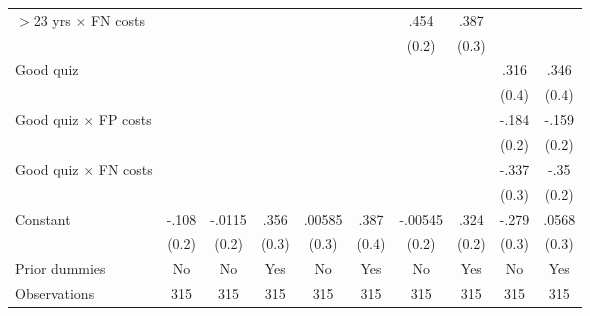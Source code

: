 \begin{table}[htbp]
\begin{tabular}{l*{9}{c}}
$>$23 yrs $\times$ FN costs&                  &                  &                  &                  &                  &     .454\sym{**} &     .387         &                  &                  \\
                &                  &                  &                  &                  &                  &    (0.2)         &    (0.3)         &                  &                  \\
Good quiz       &                  &                  &                  &                  &                  &                  &                  &     .316         &     .346         \\
                &                  &                  &                  &                  &                  &                  &                  &    (0.4)         &    (0.4)         \\
Good quiz $\times$ FP costs&                  &                  &                  &                  &                  &                  &                  &    -.184         &    -.159         \\
                &                  &                  &                  &                  &                  &                  &                  &    (0.2)         &    (0.2)         \\
Good quiz $\times$ FN costs&                  &                  &                  &                  &                  &                  &                  &    -.337         &     -.35         \\
                &                  &                  &                  &                  &                  &                  &                  &    (0.3)         &    (0.2)         \\
Constant        &    -.108         &   -.0115         &     .356         &   .00585         &     .387         &  -.00545         &     .324         &    -.279         &    .0568         \\
                &    (0.2)         &    (0.2)         &    (0.3)         &    (0.3)         &    (0.4)         &    (0.2)         &    (0.2)         &    (0.3)         &    (0.3)         \\
Prior dummies   &       No         &       No         &      Yes         &       No         &      Yes         &       No         &      Yes         &       No         &      Yes         \\
\hline
Observations    &      315         &      315         &      315         &      315         &      315         &      315         &      315         &      315         &      315         \\

\end{tabular}
\end{table}

